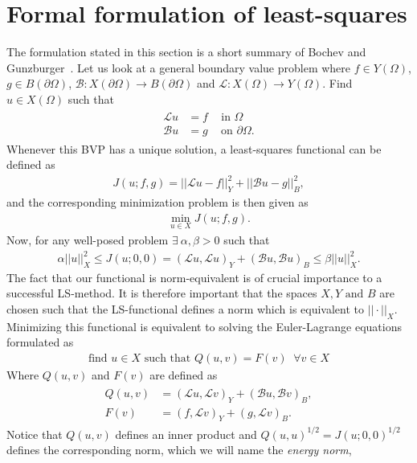 \section{Formal formulation of least-squares}
The formulation stated in this section is a short summary of Bochev and Gunzburger~\cite{Bochev}.
Let us look at a general boundary value problem where $f \in Y(\Omega)$, $g \in B(\partial \Omega)$, $\mathcal{B}\colon X(\partial \Omega) \to B(\partial\Omega) $ and $\mathcal{L}\colon X(\Omega)\to Y(\Omega)$. Find $u \in X(\Omega) $ such that 
\begin{align}
	\begin{split}
	\mathcal{L} u &= f \; \; \; \text{ in } \Omega \\
	\mathcal{B}u &= g \; \; \; \text{ on } \partial \Omega.
	\end{split}
	\label{eq:BVP}
\end{align}
Whenever this BVP has a unique solution, a least-squares functional can be defined as 
\begin{align}
	J(u;f,g) = ||\mathcal{L}u-f||^2_Y + ||\mathcal{B}u-g||^2_B,
	\label{eq:FunctionalGen}
\end{align}
and the corresponding minimization problem is then given as 
\begin{align}
	\min_{u \in X}J(u;f,g).
	\label{eq:minProbGen}
\end{align}
Now, for any well-posed problem $\exists \: \alpha,\beta > 0$ such that 
\begin{align}
	\alpha||u||_X^2 \leq J(u;0,0) = (\mathcal{L}u,\mathcal{L}u)_Y+(\mathcal{B}u,\mathcal{B}u)_B \leq \beta||u||_X^2.
	\label{eq:normEq}
\end{align}
The fact that our functional is norm-equivalent is of crucial importance to a successful LS-method. It is therefore important that the spaces $X,Y \text{ and } B$ are chosen such that the LS-functional defines a norm which is equivalent to $|| \cdot ||_X$.
Minimizing this functional is equivalent to solving the Euler-Lagrange equations formulated as 
\begin{align}
	\text{find } u \in X \text{  such that  } Q(u,v) = F(v) \; \; \forall v\in X
	\label{eq:varFormGen}
\end{align}
Where $Q(u,v)$ and $F(v)$ are defined as 
\begin{align}
	\begin{split}
	Q(u,v) &= (\mathcal{L}u,\mathcal{L}v)_Y+(\mathcal{B}u,\mathcal{B}v)_B, \\
	F(v) &= (f,\mathcal{L}v)_Y+(g,\mathcal{L}v)_B.
	\end{split}
	\label{eq:VarFormLinForms}
\end{align}
%
Notice that $Q(u,v)$ defines an inner product and $Q(u,u)^{1/2}=J(u;0,0)^{1/2}$ defines the corresponding norm, which we will name the \textit{energy norm},

